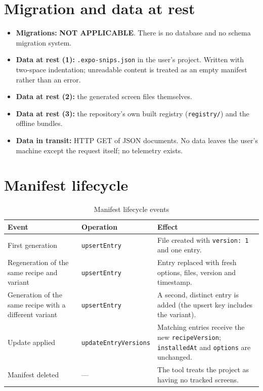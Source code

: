\section{Migration and data at rest}

\begin{itemize}
  \item \textbf{Migrations:} \textbf{NOT APPLICABLE}. There is no database and no
        schema migration system.
  \item \textbf{Data at rest (1):} \texttt{.expo-snips.json} in the user's project.
        Written with two-space indentation; unreadable content is treated as an
        empty manifest rather than an error.
  \item \textbf{Data at rest (2):} the generated screen files themselves.
  \item \textbf{Data at rest (3):} the repository's own built registry
        (\texttt{registry/}) and the offline bundles.
  \item \textbf{Data in transit:} HTTP GET of JSON documents. No data leaves the
        user's machine except the request itself; no telemetry exists.
\end{itemize}

\section{Manifest lifecycle}

\begin{longtable}{p{3.2cm}p{4.2cm}p{7cm}}
\caption{Manifest lifecycle events}\\
\toprule
\textbf{Event} & \textbf{Operation} & \textbf{Effect} \\
\midrule

First generation & \texttt{upsertEntry} & File created with \texttt{version: 1} and one
entry. \\
Regeneration of the same recipe and variant & \texttt{upsertEntry} & Entry replaced
with fresh options, files, version and timestamp. \\
Generation of the same recipe with a different variant & \texttt{upsertEntry} &
A second, distinct entry is added (the upsert key includes the variant). \\
Update applied & \texttt{updateEntryVersions} & Matching entries receive the new
\texttt{recipeVersion}; \texttt{installedAt} and \texttt{options} are unchanged. \\
Manifest deleted & --- & The tool treats the project as having no tracked screens. \\
\bottomrule
\end{longtable}

